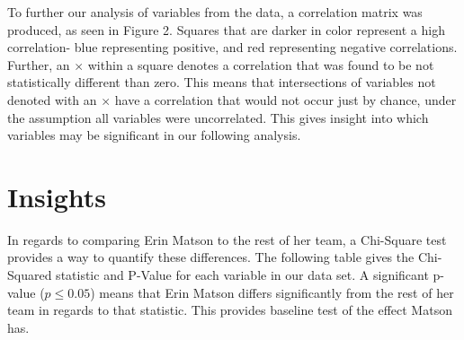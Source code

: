 \documentclass{article} %
\begin{document}
To further our analysis of variables from the data, a correlation matrix was produced, as seen in Figure 2. Squares that are darker in color represent a high correlation- blue representing positive, and red representing negative correlations. Further, an $\times$ within a square denotes a correlation that was found to be not statistically different than zero. This means that intersections of variables not denoted with an $\times$ have a correlation that would not occur just by chance, under the assumption all variables were uncorrelated. This gives insight into which variables may be significant in our following analysis. 

\section{Insights}

In regards to comparing Erin Matson to the rest of her team, a Chi-Square test provides a way to quantify these differences. The following table gives the Chi-Squared statistic and P-Value for each variable in our data set. A significant p-value ($p\le0.05$) means that Erin Matson differs significantly from the rest of her team in regards to that statistic. This provides  baseline test of the effect Matson has.                                            
\begin{table}
	\centering
	\caption{$\chi^2$ Test}
\end{table}
\end{document}
